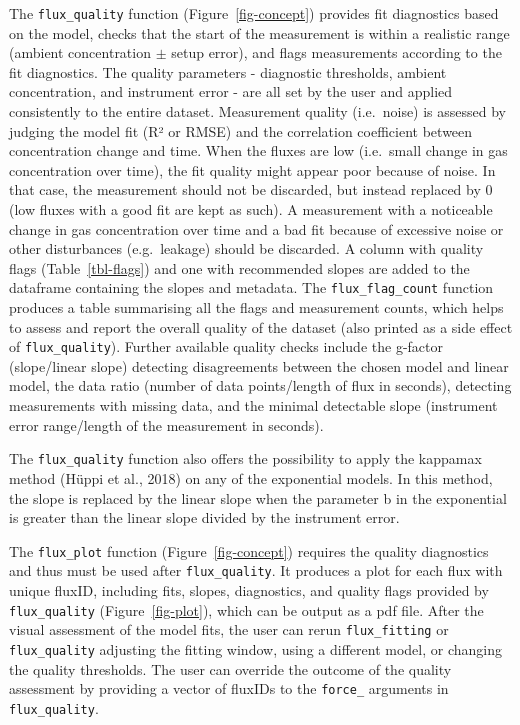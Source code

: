\documentclass[
  letterpaper,
  DIV=11,
  numbers=noendperiod]{scrartcl}
\begin{document}
The \texttt{flux\_quality} function (Figure~\ref{fig-concept}) provides
fit diagnostics based on the model, checks that the start of the
measurement is within a realistic range (ambient concentration \(\pm\)
setup error), and flags measurements according to the fit diagnostics.
The quality parameters - diagnostic thresholds, ambient concentration,
and instrument error - are all set by the user and applied consistently
to the entire dataset. Measurement quality (i.e.~noise) is assessed by
judging the model fit (R² or RMSE) and the correlation coefficient
between concentration change and time. When the fluxes are low
(i.e.~small change in gas concentration over time), the fit quality
might appear poor because of noise. In that case, the measurement should
not be discarded, but instead replaced by 0 (low fluxes with a good fit
are kept as such). A measurement with a noticeable change in gas
concentration over time and a bad fit because of excessive noise or
other disturbances (e.g.~leakage) should be discarded. A column with
quality flags (Table~\ref{tbl-flags}) and one with recommended slopes
are added to the dataframe containing the slopes and metadata. The
\texttt{flux\_flag\_count} function produces a table summarising all the
flags and measurement counts, which helps to assess and report the
overall quality of the dataset (also printed as a side effect of
\texttt{flux\_quality}). Further available quality checks include the
g-factor (slope/linear slope) detecting disagreements between the chosen
model and linear model, the data ratio (number of data points/length of
flux in seconds), detecting measurements with missing data, and the
minimal detectable slope (instrument error range/length of the
measurement in seconds).

The \texttt{flux\_quality} function also offers the possibility to apply
the kappamax method (Hüppi et al., 2018) on any of the exponential
models. In this method, the slope is replaced by the linear slope when
the parameter b in the exponential is greater than the linear slope
divided by the instrument error.

The \texttt{flux\_plot} function (Figure~\ref{fig-concept}) requires the
quality diagnostics and thus must be used after \texttt{flux\_quality}.
It produces a plot for each flux with unique fluxID, including fits,
slopes, diagnostics, and quality flags provided by
\texttt{flux\_quality} (Figure~\ref{fig-plot}), which can be output as a
pdf file. After the visual assessment of the model fits, the user can
rerun \texttt{flux\_fitting} or \texttt{flux\_quality} adjusting the
fitting window, using a different model, or changing the quality
thresholds. The user can override the outcome of the quality assessment
by providing a vector of fluxIDs to the \texttt{force\_} arguments in
\texttt{flux\_quality}.
\end{document}
